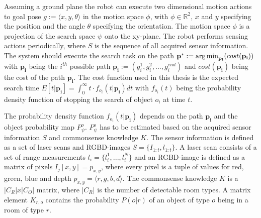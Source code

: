 Assuming a ground plane the robot can execute two dimensional motion actions to goal pose $g := \langle x,y,\theta \rangle$ in the motion space $\phi$, with $\phi \in \mathbb{R}^2$, $x$ and $y$ specifying the position and the angle $\theta$ specifying the orientation. The motion space $\phi$ is a projection of the search space $\psi$ onto the xy-plane. The robot performs sensing actions periodically, where $S$ is the sequence of all acquired sensor information. The system should execute the search task on the path $\mathbf{p^{\ast}} := \operatorname*{arg\,min}_{\mathbf{p_{i}}} (cost(\mathbf{p_i}))$ with $\mathbf{p_i}$ being the $i^{th}$ possible path $\mathbf{p_i} := (g_i^1, g_i^2, ..., g_i^{end})$ and $cost(\mathbf{p_i})$ being the cost of the path $\mathbf{p_i}$. The cost function used in this thesis is the expected search time $E[t|\mathbf{p_i}] = \int_{0}^{\infty} t \cdot f_{o_{i}}(t|\mathbf{p_i}) dt$ with $f_{o_{i}}(t)$ being the probability density function of stopping the search of object $o_{i}$ at time $t$. 

The probability density function $f_{o_{i}}(t|\mathbf{p_i})$ depends on the path $\mathbf{p_{i}}$ and the object probability map $P_{\psi}^o$. $P_{\psi}^o$ has to be estimated based on the acquired sensor information $S$ and commonsense knowledge $K$. The sensor information is defined as a set of laser scans and RGBD-images $S = \{I_{1:t}, l_{1:t}\}$. A laser scan consists of a set of range measurements $l_i = \{l_i^1,...,l_i^N\}$ and an RGBD-image is defined as a matrix of pixels $I_j[x,y]=p_{x,y}$, where every pixel is a tuple of values for red, green, blue and depth $p_{x,y}=\langle r,g,b,d\rangle$. 
The commonsense knowledge $K$ is a $|C_R|x|C_O|$ matrix, where $|C_R|$ is the number of detectable room types. A matrix element $K_{r,o}$ contains the probability $P(o|r)$ of an object of type $o$ being in a room of type $r$.

